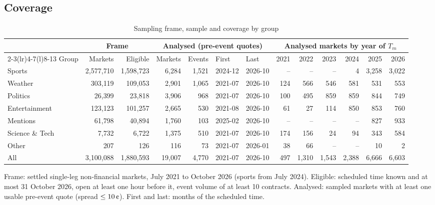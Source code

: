 
\subsection{Coverage}\label{app:xs-coverage}

\begin{table}[htbp]
\centering
\begin{threeparttable}
\caption{Sampling frame, sample and coverage by group}\label{tab:xs-coverage}
\scriptsize
\setlength{\tabcolsep}{3pt}
\begin{tabular}{@{}lrrrrllrrrrrr@{}}
\toprule
 & \multicolumn{2}{c}{Frame} & \multicolumn{4}{c}{Analysed (pre-event quotes)} & \multicolumn{6}{c}{Analysed markets by year of $T_m$} \\
\cmidrule(lr){2-3}\cmidrule(lr){4-7}\cmidrule(l){8-13}
Group & Markets & Eligible & Markets & Events & First & Last & 2021 & 2022 & 2023 & 2024 & 2025 & 2026 \\
\midrule
Sports & 2{,}577{,}710 & 1{,}598{,}723 & 6{,}284 & 1{,}521 & 2024-12 & 2026-10 & -- & -- & -- & 4 & 3{,}258 & 3{,}022 \\
Weather & 303{,}119 & 109{,}053 & 2{,}901 & 1{,}065 & 2021-07 & 2026-10 & 124 & 566 & 546 & 581 & 531 & 553 \\
Politics & 26{,}399 & 23{,}818 & 3{,}906 & 968 & 2021-07 & 2026-10 & 100 & 495 & 859 & 859 & 844 & 749 \\
Entertainment & 123{,}123 & 101{,}257 & 2{,}665 & 530 & 2021-08 & 2026-10 & 61 & 27 & 114 & 850 & 853 & 760 \\
Mentions & 61{,}798 & 40{,}894 & 1{,}760 & 103 & 2025-02 & 2026-10 & -- & -- & -- & -- & 827 & 933 \\
Science \& Tech & 7{,}732 & 6{,}722 & 1{,}375 & 510 & 2021-07 & 2026-10 & 174 & 156 & 24 & 94 & 343 & 584 \\
Other & 207 & 126 & 116 & 73 & 2021-07 & 2026-01 & 38 & 66 & -- & -- & 10 & 2 \\
\midrule All & 3{,}100{,}088 & 1{,}880{,}593 & 19{,}007 & 4{,}770 & 2021-07 & 2026-10 & 497 & 1{,}310 & 1{,}543 & 2{,}388 & 6{,}666 & 6{,}603 \\
\bottomrule
\end{tabular}
\begin{tablenotes}\footnotesize
\item Frame: settled single-leg non-financial markets, July 2021 to October 2026 (sports from July
2024). Eligible: scheduled time known and at most 31 October 2026, open at least one hour before
it, event volume of at least 10 contracts. Analysed: sampled markets with at least one usable
pre-event quote (spread $\le 10\cents$). First and last: months of the scheduled time.
\end{tablenotes}
\end{threeparttable}
\end{table}

